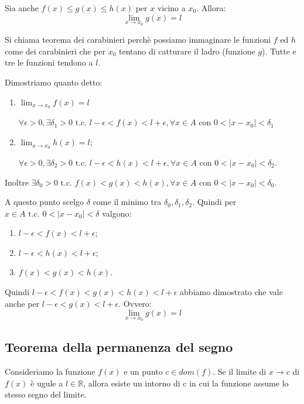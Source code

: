 Sia anche $f(x)\leq g(x)\leq h(x)$ per $x$ vicino a $x_0$. Allora:
\begin{equation}
    \lim_{x\to x_0}g(x)=l
\end{equation}
\begin{osservation}
    Si chiama teorema dei carabinieri perchè possiamo immaginare le funzioni $f$ ed $h$ come dei carabinieri che per $x_0$ tentano di catturare il ladro (funzione $g$). Tutte e tre le funzioni tendono a $l$.
\end{osservation}
\begin{dimostration}
Dimostriamo quanto detto:
    \begin{enumerate}
    
        \item $\lim_{x\to x_0}f(x)=l$
        
        $\forall\epsilon>0,\exists\delta_1>0\text{ t.c. }l-\epsilon<f(x)<l+\epsilon, \forall x\in A\text{ con } 0<|x-x_0|<\delta_1$
        \item $\lim_{x\to x_0}h(x)=l$;
        
        $\forall\epsilon>0,\exists\delta_2>0\text{ t.c. }l-\epsilon<h(x)<l+\epsilon, \forall x\in A\text{ con } 0<|x-x_0|<\delta_2$.
    \end{enumerate}
    Inoltre $\exists\delta_0>0\text{ t.c. }f(x)<g(x)<h(x), \forall x\in A\text{ con }0<|x-x_0|<\delta_0$.
    
    A questo punto scelgo $\delta$ come il minimo tra $\delta_0,\delta_1,\delta_2$.
    Quindi per $x\in A\text{ t.c. } 0<|x-x_0|<\delta$ valgono:
    \begin{enumerate}
        \item $l-\epsilon<f(x)<l+\epsilon$;
        \item $l-\epsilon<h(x)<l+\epsilon$;
        \item $f(x)<g(x)<h(x)$.
    \end{enumerate}
    
    Quindi $l-\epsilon<f(x)<g(x)<h(x)<l+\epsilon$ abbiamo dimostrato che vale anche per $l-\epsilon<g(x)<l+\epsilon$. Ovvero:
    \begin{equation}
        \lim_{x\to x_0}g(x)=l
    \end{equation}
\end{dimostration}


\subsection{Teorema della permanenza del segno}
Consideriamo la funzione $f(x)$ e un punto $c\in dom(f)$. Se il limite di $x\to c$ di $f(x)$ è ugule a $l\in\mathbb{R}$, allora esiste un intorno di c in cui la funzione assume lo stesso segno del limite.


